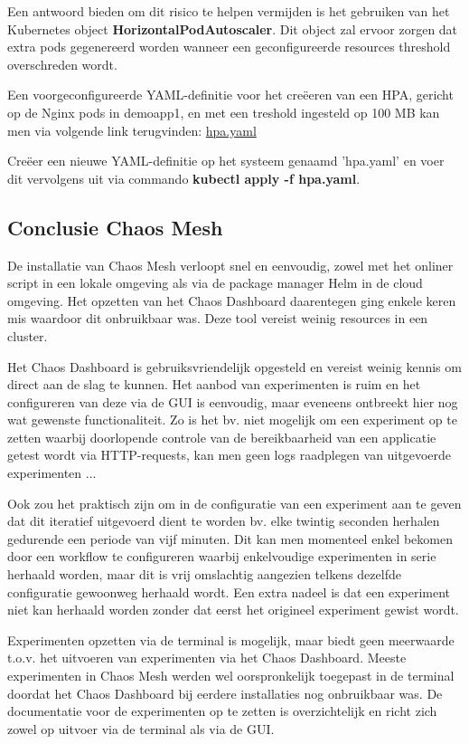 Een antwoord bieden om dit risico te helpen vermijden is het gebruiken van het Kubernetes object {\bf HorizontalPodAutoscaler}. Dit object zal ervoor zorgen dat extra pods gegenereerd worden wanneer een geconfigureerde resources threshold overschreden wordt.

Een voorgeconfigureerde YAML-definitie voor het creëeren van een HPA, gericht op de Nginx pods in demoapp1, en met een treshold ingesteld op 100 MB kan men via volgende link terugvinden: 
\href{https://github.com/KenBruggeman/BP\textunderscore 21-22/blob/master/bachelorproef/docs/chaosmesh%20experimenten/hpa.yaml}{hpa.yaml} 

Creëer een nieuwe YAML-definitie op het systeem genaamd 'hpa.yaml' en voer dit vervolgens uit via commando {\bf kubectl apply -f hpa.yaml}. 
 
\subsection{Conclusie Chaos Mesh}

De installatie van Chaos Mesh verloopt snel en eenvoudig, zowel met het onliner script in een lokale omgeving als via de package manager Helm in de cloud omgeving. Het opzetten van het Chaos Dashboard daarentegen ging enkele keren mis waardoor dit onbruikbaar was. Deze tool vereist weinig resources in een cluster. 

Het Chaos Dashboard is gebruiksvriendelijk opgesteld en vereist weinig kennis om direct aan de slag te kunnen. Het aanbod van experimenten is ruim en het configureren van deze via de GUI is eenvoudig, maar eveneens ontbreekt hier nog wat gewenste functionaliteit. Zo is het bv. niet mogelijk om een experiment op te zetten waarbij doorlopende controle van de bereikbaarheid van een applicatie getest wordt via HTTP-requests, kan men geen logs raadplegen van uitgevoerde experimenten ... 

Ook zou het praktisch zijn om in de configuratie van een experiment aan te geven dat dit iteratief uitgevoerd dient te worden bv. elke twintig seconden herhalen gedurende een periode van vijf minuten. Dit kan men momenteel enkel bekomen door een workflow te configureren waarbij enkelvoudige experimenten in serie herhaald worden, maar dit is vrij omslachtig aangezien telkens dezelfde configuratie gewoonweg herhaald wordt. Een extra nadeel is dat een experiment niet kan herhaald worden zonder dat eerst het origineel experiment gewist wordt.  

Experimenten opzetten via de terminal is mogelijk, maar biedt geen meerwaarde t.o.v. het uitvoeren van experimenten via het Chaos Dashboard. Meeste experimenten in Chaos Mesh werden wel oorspronkelijk toegepast in de terminal doordat het Chaos Dashboard bij eerdere installaties nog onbruikbaar was. De documentatie voor de experimenten op te zetten is overzichtelijk en richt zich zowel op uitvoer via de terminal als via de GUI. 

